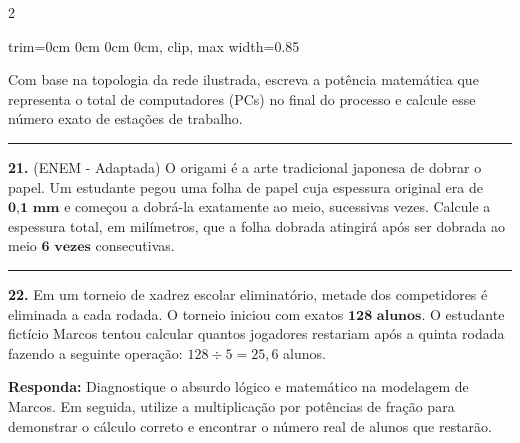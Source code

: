 \documentclass[twoside, 10pt, a4paper]{article}
\newlength{\espacoPreQuestao}\setlength{\espacoPreQuestao}{0.1cm}
\newlength{\espacoQuestao}\setlength{\espacoQuestao}{0.2cm}
\newcommand{\larguraTikz}{0.85\linewidth}
\begin{document}
\begin{multicols*}{2}
\begin{center}
\begin{adjustbox}{trim=0cm 0cm 0cm 0cm, clip, max width=\larguraTikz}
\end{adjustbox}
\end{center}
Com base na topologia da rede ilustrada, escreva a potência matemática que representa o total de computadores (PCs) no final do processo e calcule esse número exato de estações de trabalho.
\par\vspace{\espacoQuestao}

\noindent\textcolor{CorLinha}{\rule{\linewidth}{0.5pt}} 
\par\vspace{\espacoPreQuestao}
\textbf{21.} (ENEM - Adaptada) O origami é a arte tradicional japonesa de dobrar o papel. Um estudante pegou uma folha de papel cuja espessura original era de $ \textbf{0,1 mm} $ e começou a dobrá-la exatamente ao meio, sucessivas vezes. Calcule a espessura total, em milímetros, que a folha dobrada atingirá após ser dobrada ao meio $ \textbf{6 vezes} $ consecutivas.
\par\vspace{\espacoQuestao}

\noindent\textcolor{CorLinha}{\rule{\linewidth}{0.5pt}} 
\par\vspace{\espacoPreQuestao}
\textbf{22.} Em um torneio de xadrez escolar eliminatório, metade dos competidores é eliminada a cada rodada. O torneio iniciou com exatos $ \textbf{128 alunos} $. O estudante fictício Marcos tentou calcular quantos jogadores restariam após a quinta rodada fazendo a seguinte operação: $ 128 \div 5 = 25,6 $ alunos.
\begin{boxresponda}
\textbf{Responda:} Diagnostique o absurdo lógico e matemático na modelagem de Marcos. Em seguida, utilize a multiplicação por potências de fração para demonstrar o cálculo correto e encontrar o número real de alunos que restarão.
\end{boxresponda}
\par\vspace{\espacoQuestao}


\end{multicols*}
\end{document}
